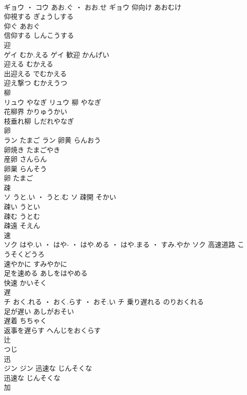 \documentclass[8pt]{extreport}
\begin{document}
\begin{CJK}{UTF8}{min}
\\	ギョウ ・ コウ	あお.ぐ ・ おお.せ	ギョウ	仰向け	あおむけ	
\\	仰視する	ぎょうしする	
\\	仰ぐ	あおぐ	
\\	信仰する	しんこうする	
\\	迎	
\\	ゲイ	むか.える	ゲイ	歓迎	かんげい	
\\	迎える	むかえる	
\\	出迎える	でむかえる	
\\	迎え撃つ	むかえうつ	
\\	柳	
\\	リュウ	やなぎ	リュウ													柳	やなぎ	
\\	花柳界	かりゅうかい	
\\	枝垂れ柳	しだれやなぎ	
\\	卵	
\\	ラン	たまご	ラン	卵黄	らんおう	
\\	卵焼き	たまごやき	
\\	産卵	さんらん	
\\	卵巣	らんそう	
\\	卵	たまご	
\\	疎	
\\	ソ	うと.い ・ うと.む	ソ	疎開	そかい	
\\	疎い	うとい	
\\	疎む	うとむ	
\\	疎遠	そえん	
\\	速	
\\	ソク	はや.い ・ はや- ・ はや.める ・ はや.まる ・ すみ.やか	ソク	高速道路	こうそくどうろ	
\\	速やかに	すみやかに	
\\	足を速める	あしをはやめる	
\\	快速	かいそく	
\\	遅	
\\	チ	おく.れる ・ おく.らす ・ おそ.い	チ	乗り遅れる	のりおくれる	
\\	足が遅い	あしがおそい	
\\	遅着	ちちゃく	
\\	返事を遅らす	へんじをおくらす	
\\	辻	
\\	つじ																																				
\\	迅	
\\	ジン		ジン	迅速な	じんそくな	
\\	迅速な	じんそくな	
\\	加	

\end{CJK}
\end{document}
